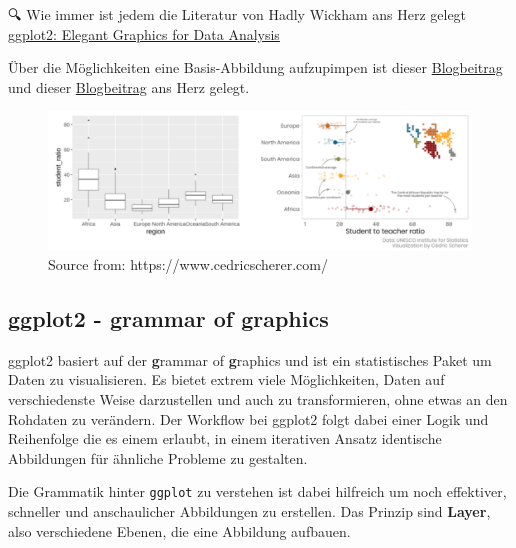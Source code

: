 \documentclass[
]{article}
\begin{document}
🔍 Wie immer ist jedem die Literatur von Hadly Wickham ans Herz gelegt \href{https://ggplot2-book.org/introduction.html}{ggplot2: Elegant Graphics for Data Analysis}

Über die Möglichkeiten eine Basis-Abbildung aufzupimpen ist dieser \href{https://www.cedricscherer.com/2019/05/17/the-evolution-of-a-ggplot-ep.-1/}{Blogbeitrag} und dieser \href{https://www.cedricscherer.com/2019/08/05/a-ggplot2-tutorial-for-beautiful-plotting-in-r/}{Blogbeitrag} ans Herz gelegt.

\begin{figure}

{\centering \includegraphics[width=1\linewidth]{images/053} 

}

\caption{Source from: https://www.cedricscherer.com/}\label{fig:unnamed-chunk-170}
\end{figure}

\hypertarget{ggplot2---grammar-of-graphics}{%
\subsection{ggplot2 - grammar of graphics}\label{ggplot2---grammar-of-graphics}}

ggplot2 basiert auf der \textbf{g}rammar of \textbf{g}raphics und ist ein statistisches Paket um Daten zu visualisieren. Es bietet extrem viele Möglichkeiten, Daten auf verschiedenste Weise darzustellen und auch zu transformieren, ohne etwas an den Rohdaten zu verändern. Der Workflow bei ggplot2 folgt dabei einer Logik und Reihenfolge die es einem erlaubt, in einem iterativen Ansatz identische Abbildungen für ähnliche Probleme zu gestalten.

Die Grammatik hinter \texttt{ggplot} zu verstehen ist dabei hilfreich um noch effektiver, schneller und anschaulicher Abbildungen zu erstellen. Das Prinzip sind \textbf{Layer}, also verschiedene Ebenen, die eine Abbildung aufbauen.
\end{document}
